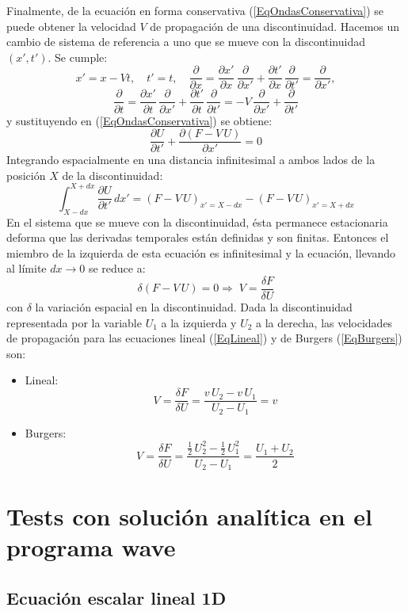 \documentclass[a4paper,10pt]{report}
\newcommand{\EQ}[2]{\begin{equation}#1\label{#2}\end{equation}}
\newcommand{\HALF}{\frac{1}{2}}
\newcommand{\PA}[1]{\left(#1\right)}
\newcommand{\PARTIAL}[2]{\frac{\partial#1}{\partial#2}}
\begin{document}
Finalmente, de la ecuación en forma conservativa (\ref{EqOndasConservativa}) se puede obtener la velocidad $V$ de propagación de una discontinuidad. Hacemos un cambio de sistema de referencia a uno que se mueve con la discontinuidad $(x',t')$. Se cumple:
\[
	x'=x-Vt,\quad t'=t,\quad
	\PARTIAL{}{x}=\PARTIAL{x'}{x}\,\PARTIAL{}{x'}+\PARTIAL{t'}{x}\,\PARTIAL{}{t'}=\PARTIAL{}{x'},
\]
\EQ
{
	\PARTIAL{}{t}=\PARTIAL{x'}{t}\,\PARTIAL{}{x'}+\PARTIAL{t'}{t}\,\PARTIAL{}{t'}=-V\,\PARTIAL{}{x'}+\PARTIAL{}{t'}
}{EqOndasCambio}
y sustituyendo en (\ref{EqOndasConservativa}) se obtiene:
\EQ{\PARTIAL{U}{t'}+\PARTIAL{(F-V\,U)}{x'}=0}{EqOndasConservativaCambio}
Integrando espacialmente en una distancia infinitesimal a ambos lados de la posición $X$ de la discontinuidad:
\EQ{\int_{X-dx}^{X+dx}\PARTIAL{U}{t'}\,dx'=\PA{F-V\,U}_{x'=X-dx}-\PA{F-V\,U}_{x'=X+dx}}{EqOndasIntegralCambio}
En el sistema que se mueve con la discontinuidad, ésta permanece estacionaria deforma que las derivadas temporales están definidas y son finitas. Entonces el miembro de la izquierda de esta ecuación es infinitesimal y la ecuación, llevando al límite $dx\rightarrow 0$ se reduce a:
\EQ{\delta\PA{F-V\,U}=0\Rightarrow\;V=\frac{\delta F}{\delta U}}{EqOndasDiscontinuidad}
con $\delta$ la variación espacial en la discontinuidad. Dada la discontinuidad representada por la variable $U_1$ a la izquierda y $U_2$ a la derecha, las velocidades de propagación para las ecuaciones lineal (\ref{EqLineal}) y de Burgers (\ref{EqBurgers}) son:
\begin{itemize}
\item Lineal:
\EQ{V=\frac{\delta F}{\delta U}=\frac{v\,U_2-v\,U_1}{U_2-U_1}=v}{EqDiscontinuidadLineal}
\item Burgers:
\EQ{V=\frac{\delta F}{\delta U}=\frac{\HALF\,U_2^2-\HALF\,U_1^2}{U_2-U_1}=\frac{U_1+U_2}{2}}{EqDiscontinuidadBurgers}
\end{itemize}

\chapter{Tests con solución analítica en el programa wave}

\section{Ecuación escalar lineal 1D}
\end{document}
